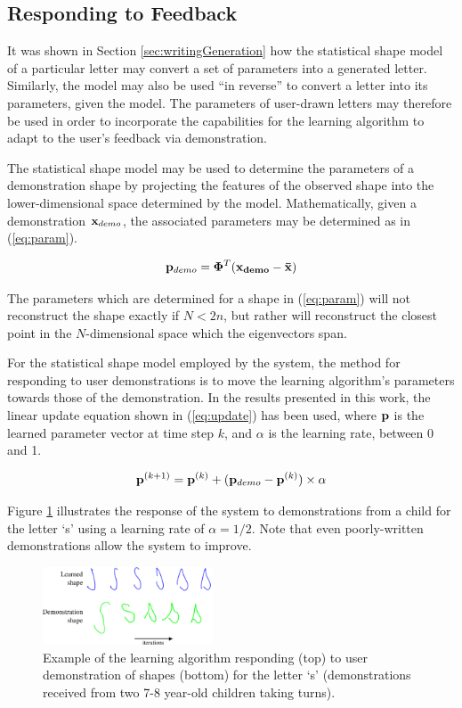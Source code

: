 \documentclass{sig-alternate}
\begin{document}
\subsection{Responding to Feedback}

It was shown in Section \ref{sec:writingGeneration} how the statistical shape
model of a particular letter may convert a set of parameters into a generated
letter. Similarly, the model may also be used ``in reverse'' 
to convert a
letter into its parameters, given the model. The parameters of user-drawn
letters may therefore be used in order to incorporate the capabilities for the
learning algorithm to adapt to the user's feedback via demonstration.

The statistical shape model may be used to determine the parameters of a
demonstration shape by projecting the features of the observed shape into the
lower-dimensional space determined by the model. Mathematically, given a
demonstration ${\bf x}_{demo}$, the associated parameters may be determined as in
(\ref{eq:param}).

\begin{equation}\label{eq:param}
{\bf p}_{demo} ={\bf \Phi}^T ({\bf{x}_{demo}}-\bf{\bar{x}})
\end{equation}

The parameters which are determined for a shape in (\ref{eq:param}) will not
reconstruct the shape exactly if $N<2n$, but rather will reconstruct the closest
point in the $N$-dimensional space which the eigenvectors span.

For the statistical shape model employed by the system, the method for
responding to user demonstrations is to move the learning algorithm's parameters
towards those of the demonstration. In the results presented in this work, the
linear update equation shown in (\ref{eq:update}) has been used, where ${\bf p}$ is the
learned parameter vector at time step $k$, and $\alpha$ is the learning rate,
between 0 and 1.  

\begin{equation}\label{eq:update}
{\bf p}^{(k+1)} = {\bf p}^{(k)} + ({\bf p}_{demo}-{\bf
p}^{(k)})\times\alpha
\end{equation}

Figure \ref{fig:demonstrationShapes2} illustrates the response of the system to
demonstrations from a child for the letter `s' using a learning rate of
$\alpha=1/2$.  Note that even poorly-written demonstrations allow the system to improve.

\begin{figure}[thpb]
    \centering
    \includegraphics[width=0.45\textwidth]{figures/learningSdemo}
    \caption{\label{fig:demonstrationShapes2}Example of the learning algorithm
    responding (top) to user demonstration of shapes (bottom) for the letter `s' (demonstrations received from two 7-8 year-old children taking turns).}
\end{figure}
\end{document}

